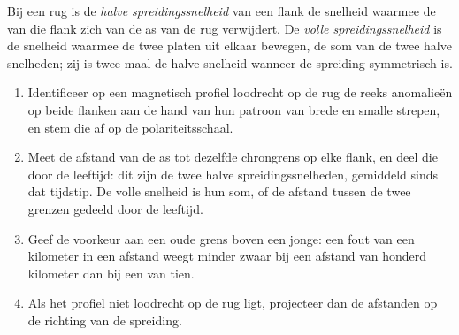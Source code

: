 \begin{omfigure}
\par{}
\label{fig:b1:plate-kinematics:stripes}
\end{omfigure}

\begin{definition}\label{def:b1:plate-kinematics:spreading-rate}
Bij een rug is de \emph{halve spreidingssnelheid} van een flank de snelheid waarmee de  van die flank zich van de as van de rug verwijdert. De \emph{volle spreidingssnelheid} is de snelheid waarmee de twee platen uit elkaar bewegen, de som van de twee halve snelheden; zij is twee maal de halve snelheid wanneer de spreiding symmetrisch is.
\end{definition}

\begin{method}\label{met:b1:plate-kinematics:rate}
\begin{enumerate}
  \item Identificeer op een magnetisch profiel loodrecht op de rug de reeks anomalieën op beide flanken aan de hand van hun patroon van brede en smalle strepen, en stem die af op de polariteitsschaal.
  \item Meet de afstand van de as tot dezelfde chrongrens op elke flank, en deel die door de leeftijd: dit zijn de twee halve spreidingssnelheden, gemiddeld sinds dat tijdstip. De volle snelheid is hun som, of de afstand tussen de twee grenzen gedeeld door de leeftijd.
  \item Geef de voorkeur aan een oude grens boven een jonge: een fout van een kilometer in een afstand weegt minder zwaar bij een afstand van honderd kilometer dan bij een van tien.
  \item Als het profiel niet loodrecht op de rug ligt, projecteer dan de afstanden op de richting van de spreiding.
\end{enumerate}
\end{method}

